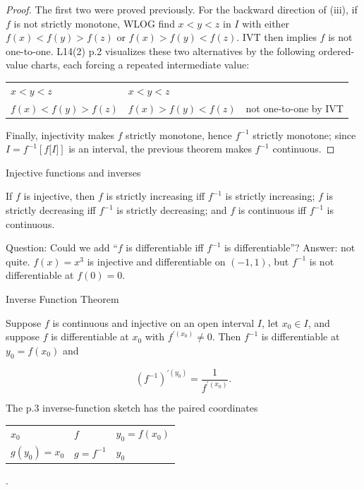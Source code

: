 \begin{proof}

The first two were proved previously. For the backward direction of (iii), if \(f\) is not strictly monotone, WLOG find \(x < y < z\) in \(I\) with either \(f(x) < f(y) > f(z)\) or \(f(x) > f(y) < f(z)\). IVT then implies \(f\) is not one-to-one. L14(2) p.2 visualizes these two alternatives by the following ordered-value charts, each forcing a repeated intermediate value:

{\def\LTcaptype{none} %
\begin{longtable}[]{@{}lll@{}}
\toprule\noalign{}
\endhead
\bottomrule\noalign{}
\endlastfoot
\(x < y < z\) & \(x < y < z\) & \\
\(f(x) < f(y) > f(z)\) & \(f(x) > f(y) < f(z)\) & not one-to-one by IVT \\
\end{longtable}
}

Finally, injectivity makes \(f\) strictly monotone, hence \(f^{- 1}\) strictly monotone; since \(I = f^{- 1}\left\lbrack {f\lbrack I\rbrack} \right\rbrack\) is an interval, the previous theorem makes \(f^{- 1}\) continuous.

\end{proof}

\begin{corollary}{Injective functions and inverses}

If \(f\) is injective, then \(f\) is strictly increasing iff \(f^{- 1}\) is strictly increasing; \(f\) is strictly decreasing iff \(f^{- 1}\) is strictly decreasing; and \(f\) is continuous iff \(f^{- 1}\) is continuous.

Question: Could we add ``\(f\) is differentiable iff \(f^{- 1}\) is differentiable''? Answer: not quite. \(f(x) = x^{3}\) is injective and differentiable on \(\left( {- 1,1} \right)\), but \(f^{- 1}\) is not differentiable at \(f(0) = 0\).

\end{corollary}

\begin{theorem}{Inverse Function Theorem}

Suppose \(f\) is continuous and injective on an open interval \(I\), let \(x_{0} \in I\), and suppose \(f\) is differentiable at \(x_{0}\) with \(f^{'{(x_{0})}} \neq 0\). Then \(f^{- 1}\) is differentiable at \(y_{0} = f\left( x_{0} \right)\) and

\[\left( f^{- 1} \right)^{'{(y_{0})}} = \frac{1}{f^{'{(x_{0})}}}.\]

The p.3 inverse-function sketch has the paired coordinates

{\def\LTcaptype{none} %
\begin{longtable}[]{@{}lll@{}}
\toprule\noalign{}
\endhead
\bottomrule\noalign{}
\endlastfoot
\(x_{0}\) & \(f\) & \(y_{0} = f\left( x_{0} \right)\) \\
\(g\left( y_{0} \right) = x_{0}\) & \(g = f^{- 1}\) & \(y_{0}\) \\
\end{longtable}
}

.

\end{theorem}

